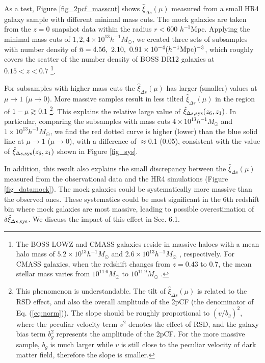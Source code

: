 \documentclass[iop]{emulateapj}
\begin{document}
As a test, Figure \ref{fig_2pcf_masscut} shows $\hat \xi_{\Delta s}(\mu)$ measured from a small HR4 galaxy sample with different minimal mass cuts.
The mock galaxies are taken from the $z=0$ snapshot data within the radius $r<600$ $h^{-1}$Mpc.
Applying the minimal mass cuts of $1,2,4\times 10^{13} h^{-1} M_{\odot}$, 
we created three sets of subsamples with number density of 
$\bar n=4.56,\ 2.10,\ 0.91 \times 10^{-4} ( h^{-1} \rm Mpc)^{-3}$, 
which roughly covers the scatter of the number density of BOSS DR12 galaxies at $0.15<z<0.7$
\footnote{The BOSS LOWZ and CMASS galaxies reside in massive haloes 
with a mean halo mass of $5.2 \times 10^{13} h^{-1} M_{\odot}$ and $2.6 \times 10^{13} h^{-1} M_{\odot}$ \citep{Parejko2013,White2011,Reidetal:2016},
respectively.
For CMASS galaxies, when the redshift changes from $z=0.43$ to $0.7$,
the mean stellar mass varies from $10^{11.6} {M_{\odot}}$ to $10^{11.9} {M_{\odot}}$ \citep{CMASSLSS2014}.}.



For subsamples with higher mass cuts the $\hat\xi_{\Delta s}(\mu)$
has larger (smaller) values at $\mu\rightarrow1$ ($\mu\rightarrow0$).
More massive samples result in less tilted $\hat\xi_{\Delta s}(\mu)$ in the region of $1-\mu\gtrsim0.1$
\footnote{This phenomenon is understandable.
The tilt of $\hat\xi_{\Delta s}(\mu)$ is related to the RSD effect, 
and also the overall amplitude of the 2pCF (the denominator of Eq. (\ref{eq:norm})).
The slope should be roughly proportional to $(v/b_g)^2$, 
where the peculiar velocity term $v^2$ denotes the effect of RSD, 
and the galaxy bias term $b_g^2$ represents the amplitude of the 2pCF. 
For the more massive sample, $b_g$ is much larger while $v$ is still close to the peculiar velocity of dark matter field,
therefore the slope is smaller.
}.
This explains the relative large value of $\hat \xi_{\Delta s,\rm sys}(z_6, z_1)$.
In particular, comparing the subsamples with mass cuts $4\times 10^{13}h^{-1} M_{\odot}$ and $1\times 10^{13}h^{-1} M_{\odot}$, 
we find the red dotted curve is higher (lower) than the blue solid line at $\mu\rightarrow1$ ($\mu\rightarrow0$),
with a difference of $\approx$0.1 (0.05),
consistent with the value of $\hat \xi_{\Delta s,\rm sys}(z_6, z_1)$ shown in Figure \ref{fig_sys}.

In addition, this result also explains the small discrepancy between the $\hat\xi_{\Delta s}(\mu)$ measured from the 
observational data and the HR4 simulations (Figure \ref{fig_datamock}).
The mock galaxies could be systematically more massive than the observed ones.
These systematics could be most significant in the 6th redshift bin
where mock galaxies are most massive, 
leading to possible overestimation of $\delta\hat\xi_{\Delta s,{\rm sys}}$.
We discuss the impact of this effect in Sec. 6.1.
\end{document}
